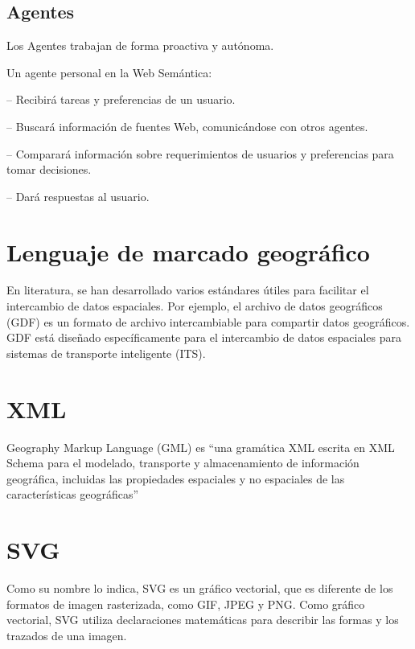 \subsection{Agentes}


Los Agentes trabajan de forma proactiva y autónoma.


Un agente personal en la Web Semántica:

– Recibirá tareas y preferencias de un usuario.

– Buscará información de fuentes Web, comunicándose con otros agentes.

– Comparará información sobre requerimientos de usuarios y preferencias para tomar decisiones.

– Dará respuestas al usuario.


\section{Lenguaje de marcado geográfico}

En literatura, se han desarrollado varios estándares útiles para facilitar el intercambio de datos espaciales. Por ejemplo, el archivo de datos geográficos (GDF) es un formato de archivo intercambiable para compartir datos geográficos. GDF está diseñado específicamente para el intercambio de datos espaciales para sistemas de transporte inteligente (ITS).




\section{XML}

Geography Markup Language (GML) es “una gramática XML escrita en XML Schema para el modelado, transporte y almacenamiento de información geográfica, incluidas las propiedades espaciales y no espaciales de las características geográficas”

\section{SVG}

Como su nombre lo indica, SVG es un gráfico vectorial, que es diferente de los formatos de imagen rasterizada, como GIF, JPEG y PNG. Como gráfico vectorial, SVG utiliza declaraciones matemáticas para describir las formas y los trazados de una imagen.\\

